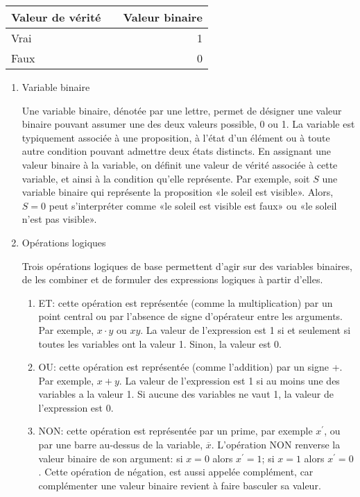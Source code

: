 \documentclass[letter, oneside]{book}
\begin{document}
\begin{center}
\begin{tabular}{llr}
Valeur de vérité &  & Valeur binaire\\[0pt]
\hline
Vrai &  & 1\\[0pt]
Faux &  & 0\\[0pt]
\end{tabular}
\end{center}


\begin{enumerate}
\item Variable binaire
\label{sec:orge34f251}

Une variable binaire, dénotée par une lettre, permet de désigner une
valeur binaire pouvant assumer une des deux valeurs possible, 0
ou 1. La variable est typiquement associée à une proposition, à l'état
d'un élément ou à toute autre condition pouvant admettre deux états
distincts. En assignant une valeur binaire à la variable, on définit
une valeur de vérité associée à cette variable, et ainsi à la
condition qu'elle représente. Par exemple, soit \(S\) une variable
binaire qui représente la proposition «le soleil est visible». Alors,
\(S=0\) peut s'interpréter comme «le soleil est visible est faux» ou
«le soleil n'est pas visible».

\item Opérations logiques
\label{sec:orgb91c8ca}

Trois opérations logiques de base permettent d'agir sur des variables
binaires, de les combiner et de formuler des expressions logiques à
partir d'elles.

\begin{enumerate}
\item ET: cette opération est représentée (comme la multiplication) par
un point central ou par l'absence de signe d'opérateur entre les
arguments. Par exemple, \(x \cdot y\) ou \(x y\). La valeur de
l'expression est 1 si et seulement si toutes les variables ont la
valeur 1. Sinon, la valeur est 0.
\item OU: cette opération est représentée (comme l'addition) par un signe
+. Par exemple, \(x + y\). La valeur de l'expression est 1 si au
moins une des variables a la valeur 1. Si aucune des variables ne
vaut 1, la valeur de l'expression est 0.
\item NON: cette opération est représentée par un prime, par
exemple \(x^\prime\), ou par une barre au-dessus de la variable,
\(\overline{x}\).  L'opération NON renverse la valeur binaire de
son argument: si \(x =0\) alors \(x^ \prime = 1\); si \(x =1\)
alors \(x^ \prime = 0\). Cette opération de négation, est aussi
appelée complément, car complémenter une valeur binaire revient à
faire basculer sa valeur.
\end{enumerate}


\end{enumerate}
\end{document}
